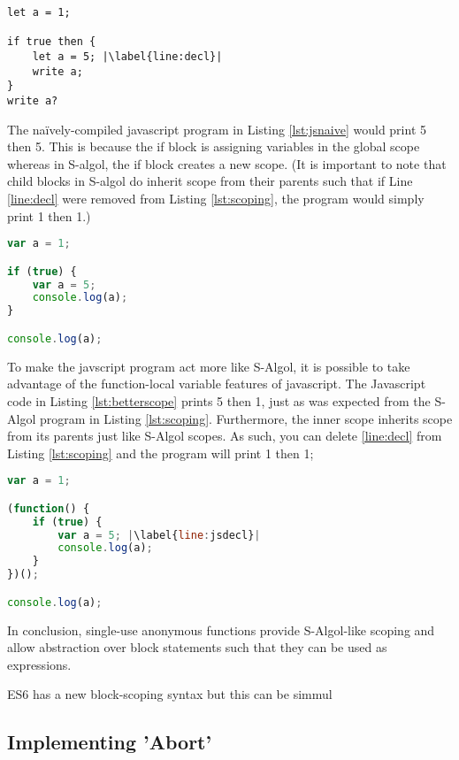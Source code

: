 \documentclass{article}
\begin{document}
\begin{lstlisting}[caption={S-Algol scoping},label={lst:scoping}, escapechar="|"]
let a = 1;

if true then {
	let a = 5; |\label{line:decl}|
	write a;
}
write a?
\end{lstlisting}

The naïvely-compiled javascript program in Listing \ref{lst:jsnaive} would print 5 then 5. This is because the if block is assigning variables in the global scope whereas in S-algol, the if block creates a new scope. (It is important to note that child blocks in S-algol do inherit scope from their parents such that if Line \ref{line:decl} were removed from Listing \ref{lst:scoping}, the program would simply print 1 then 1.)

\begin{lstlisting}[caption={Javascript scoping},label={lst:jsnaive}, language=javascript, escapechar="|"]
var a = 1;

if (true) {
	var a = 5;
	console.log(a);
}

console.log(a);
\end{lstlisting}

To make the javscript program act more like S-Algol, it is possible to take advantage of the function-local variable features of javascript. The Javascript code in Listing \ref{lst:betterscope} prints 5 then 1, just as was expected from the S-Algol program in Listing \ref{lst:scoping}. Furthermore, the inner scope inherits scope from its parents just like S-Algol scopes. As such, you can delete \ref{line:decl} from Listing \ref{lst:scoping} and the program will print 1 then 1;

\begin{lstlisting}[caption={S-Algol-like Javascript scoping},label={lst:betterscope}, language=javascript, escapechar="|"]
var a = 1;

(function() {
	if (true) {
		var a = 5; |\label{line:jsdecl}|
		console.log(a);
	}
})();

console.log(a);
\end{lstlisting}

In conclusion, single-use anonymous functions provide S-Algol-like scoping and allow abstraction over block statements such that they can be used as expressions.


ES6 has a new block-scoping syntax but this can be simmul


\subsection{Implementing 'Abort'}
\end{document}
